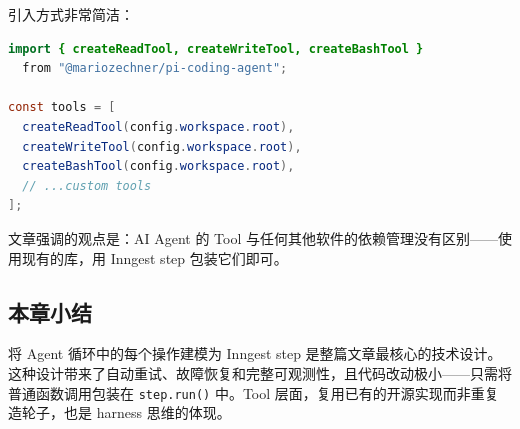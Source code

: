 引入方式非常简洁：

\begin{lstlisting}[caption={Tool 引入示例},language=Java]
import { createReadTool, createWriteTool, createBashTool }
  from "@mariozechner/pi-coding-agent";

const tools = [
  createReadTool(config.workspace.root),
  createWriteTool(config.workspace.root),
  createBashTool(config.workspace.root),
  // ...custom tools
];
\end{lstlisting}

文章强调的观点是：AI Agent 的 Tool 与任何其他软件的依赖管理没有区别——使用现有的库，用 Inngest step 包装它们即可。

\subsection{本章小结}

将 Agent 循环中的每个操作建模为 Inngest step 是整篇文章最核心的技术设计。这种设计带来了自动重试、故障恢复和完整可观测性，且代码改动极小——只需将普通函数调用包装在 \texttt{step.run()} 中。Tool 层面，复用已有的开源实现而非重复造轮子，也是 harness 思维的体现。


